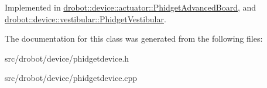 Implemented in \hyperlink{classdrobot_1_1device_1_1actuator_1_1PhidgetAdvancedBoard_a67afbf98c18b80281226259f93fdb742}{drobot\-::device\-::actuator\-::\-Phidget\-Advanced\-Board}, and \hyperlink{classdrobot_1_1device_1_1vestibular_1_1PhidgetVestibular_a8292d6ebbc1910eca84081cf76bf3afe}{drobot\-::device\-::vestibular\-::\-Phidget\-Vestibular}.



The documentation for this class was generated from the following files\-:\begin{DoxyCompactItemize}
\item 
src/drobot/device/phidgetdevice.\-h\item 
src/drobot/device/phidgetdevice.\-cpp\end{DoxyCompactItemize}
